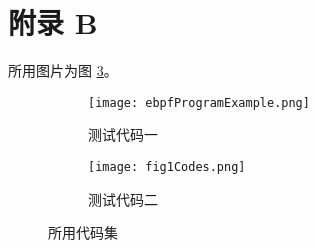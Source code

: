 \section*{附录 B}
    所用图片为图 \ref{fig3}。
    \begin{figure}[htp!]
        \centering
        \begin{subfigure}{0.3\linewidth}
            \texttt{[image: ebpfProgramExample.png]} %
            \caption{测试代码一}
            \label{f3son1}
        \end{subfigure} 
        \begin{subfigure}{0.3\linewidth}
            \texttt{[image: fig1Codes.png]} %
            \caption{测试代码二}
            \label{f3son2}
        \end{subfigure}
        \caption{所用代码集}
        \label{fig3}
    \end{figure}

